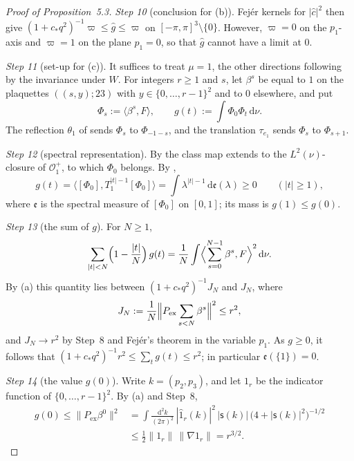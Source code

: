 \documentclass[11pt,letterpaper,reqno]{amsart}
\theoremstyle{definition}
\begin{document}
\begin{proof}[Proof of Proposition~5.3]
\emph{Step 10} (conclusion for (b)).
Fej\'er kernels for $|\hat c|^2$ then give $(1+c_*q^2)^{-1}\varpi\le\hat g\le\varpi$ on $[-\pi,\pi]^3\setminus\{0\}$.
However, $\varpi=0$ on the $p_1$-axis and $\varpi=1$ on the plane $p_1=0$, so that $\hat g$ cannot have a limit at $0$.

\emph{Step 11} (set-up for (c)).
It suffices to treat $\mu=1$, the other directions following by the invariance under $W$.
For integers $r\ge1$ and $s$, let $\beta^s$ be equal to $1$ on the plaquettes $((s,y);23)$ with $y\in\{0,\dots,r-1\}^2$ and to $0$ elsewhere, and put
\begin{equation*}
\Phi_s:=\langle\beta^s,F\rangle,\qquad g(t):=\int\Phi_0\Phi_t\,\mathrm d\nu.
\end{equation*}
The reflection $\theta_1$ of \cite[Definition~10.11]{QEDII} sends $\Phi_s$ to $\Phi_{-1-s}$, and the translation $\tau_{e_1}$ sends $\Phi_s$ to $\Phi_{s+1}$.

\emph{Step 12} (spectral representation).
By \cite[Lemma~10.9\,(a)]{QEDII} the class map extends to the $L^2(\nu)$-closure of $\mathcal O^+_1$, to which $\Phi_0$ belongs.
By \cite[Lemma~10.9\,(b), (d)]{QEDII},
\begin{equation*}
g(t)=\bigl\langle[\Phi_0],T_1^{|t|-1}[\Phi_0]\bigr\rangle=\int\lambda^{|t|-1}\,\mathrm d\mathfrak e(\lambda)\ge0\qquad(|t|\ge1),
\end{equation*}
where $\mathfrak e$ is the spectral measure of $[\Phi_0]$ on $[0,1]$; its mass is $g(1)\le g(0)$.

\emph{Step 13} (the sum of $g$).
For $N\ge1$,
\begin{equation*}
\sum_{|t|<N}\Bigl(1-\frac{|t|}{N}\Bigr)\,g(t)=\frac1N\int\Bigl\langle\sum_{s=0}^{N-1}\beta^s,F\Bigr\rangle^2\,\mathrm d\nu.
\end{equation*}
By (a) this quantity lies between $(1+c_*q^2)^{-1}J_N$ and $J_N$, where
\begin{equation*}
J_N:=\frac1N\Bigl\|P_{\mathrm{ex}}\sum_{s<N}\beta^s\Bigr\|^2\le r^2,
\end{equation*}
and $J_N\to r^2$ by Step~8 and Fej\'er's theorem in the variable $p_1$.
As $g\ge0$, it follows that $(1+c_*q^2)^{-1}r^2\le\sum_tg(t)\le r^2$; in particular $\mathfrak e(\{1\})=0$.

\emph{Step 14} (the value $g(0)$).
Write $k=(p_2,p_3)$, and let $1_r$ be the indicator function of $\{0,\dots,r-1\}^2$.
By (a) and Step~8,
\begin{align*}
g(0)\le\|P_{\mathrm{ex}}\beta^0\|^2
&=\int\frac{\mathrm d^2k}{(2\pi)^2}\,|\hat{1}_r(k)|^2\,|\mathsf s(k)|\,\bigl(4+|\mathsf s(k)|^2\bigr)^{-1/2}\\
&\le\frac12\|1_r\|\,\|\nabla 1_r\|=r^{3/2}.
\end{align*}


\end{proof}
\end{document}
